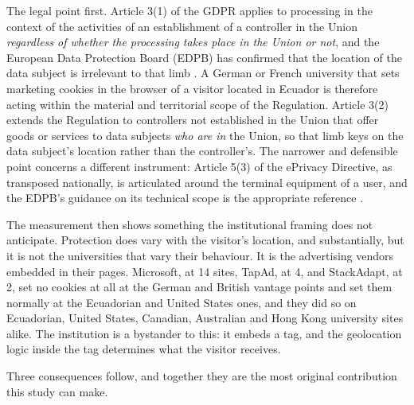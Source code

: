 \documentclass[pdflatex,sn-basic,Numbered,iicol]{sn-jnl}
\theoremstyle{thmstyleone}
\theoremstyle{thmstyletwo}
\theoremstyle{thmstylethree}
\begin{document}
The legal point first. Article 3(1) of the GDPR applies to processing in the context of the activities of an establishment of a controller in the Union \emph{regardless of whether the processing takes place in the Union or not}, and the European Data Protection Board (EDPB) has confirmed that the location of the data subject is irrelevant to that limb \citep{gdpr2016,edpb2019territorial}. A German or French university that sets marketing cookies in the browser of a visitor located in Ecuador is therefore acting within the material and territorial scope of the Regulation. Article 3(2) extends the Regulation to controllers not established in the Union that offer goods or services to data subjects \emph{who are in} the Union, so that limb keys on the data subject's location rather than the controller's. The narrower and defensible point concerns a different instrument: Article 5(3) of the ePrivacy Directive, as transposed nationally, is articulated around the terminal equipment of a user, and the EDPB's guidance on its technical scope is the appropriate reference \citep{eprivacy2002,edpb2024eprivacy}.

The measurement then shows something the institutional framing does not anticipate. Protection does vary with the visitor's location, and substantially, but it is not the universities that vary their behaviour. It is the advertising vendors embedded in their pages. Microsoft, at 14 sites, TapAd, at 4, and StackAdapt, at 2, set no cookies at all at the German and British vantage points and set them normally at the Ecuadorian and United States ones, and they did so on Ecuadorian, United States, Canadian, Australian and Hong Kong university sites alike. The institution is a bystander to this: it embeds a tag, and the geolocation logic inside the tag determines what the visitor receives.

Three consequences follow, and together they are the most original contribution this study can make.
\end{document}

